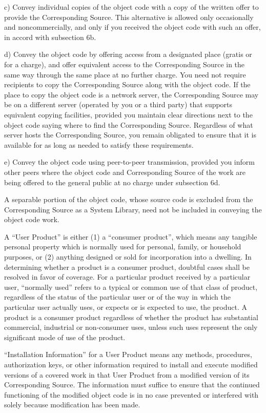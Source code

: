     c) Convey individual copies of the object code with a copy of the
    written offer to provide the Corresponding Source.  This
    alternative is allowed only occasionally and noncommercially, and
    only if you received the object code with such an offer, in accord
    with subsection 6b.

    d) Convey the object code by offering access from a designated
    place (gratis or for a charge), and offer equivalent access to the
    Corresponding Source in the same way through the same place at no
    further charge.  You need not require recipients to copy the
    Corresponding Source along with the object code.  If the place to
    copy the object code is a network server, the Corresponding Source
    may be on a different server (operated by you or a third party)
    that supports equivalent copying facilities, provided you maintain
    clear directions next to the object code saying where to find the
    Corresponding Source.  Regardless of what server hosts the
    Corresponding Source, you remain obligated to ensure that it is
    available for as long as needed to satisfy these requirements.

    e) Convey the object code using peer-to-peer transmission, provided
    you inform other peers where the object code and Corresponding
    Source of the work are being offered to the general public at no
    charge under subsection 6d.

  A separable portion of the object code, whose source code is excluded
from the Corresponding Source as a System Library, need not be
included in conveying the object code work.

  A ``User Product'' is either (1) a ``consumer product'', which means any
tangible personal property which is normally used for personal, family,
or household purposes, or (2) anything designed or sold for incorporation
into a dwelling.  In determining whether a product is a consumer product,
doubtful cases shall be resolved in favor of coverage.  For a particular
product received by a particular user, ``normally used'' refers to a
typical or common use of that class of product, regardless of the status
of the particular user or of the way in which the particular user
actually uses, or expects or is expected to use, the product.  A product
is a consumer product regardless of whether the product has substantial
commercial, industrial or non-consumer uses, unless such uses represent
the only significant mode of use of the product.

  ``Installation Information'' for a User Product means any methods,
procedures, authorization keys, or other information required to install
and execute modified versions of a covered work in that User Product from
a modified version of its Corresponding Source.  The information must
suffice to ensure that the continued functioning of the modified object
code is in no case prevented or interfered with solely because
modification has been made.

